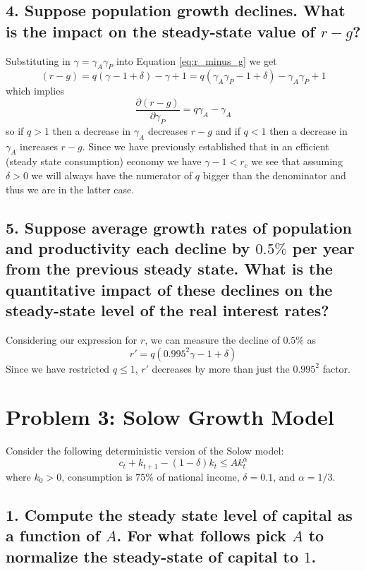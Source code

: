 \documentclass[10pt,letter]{article}
\begin{document}
\subsection*{4. Suppose population growth declines. What is the impact on the steady-state value of $r-g$? }
Substituting in $\gamma = \gamma_A \gamma_P$ into Equation \ref{eq:r_minus_g} we get
\begin{equation*}
	(r-g) = q(\gamma -1 + \delta) - \gamma +1 = q(\gamma_A \gamma_P -1 + \delta) - \gamma_A \gamma_P+1  
\end{equation*}
which implies
\begin{equation*}
	\frac{\partial (r-g)}{\partial \gamma_P} = q\gamma_A - \gamma_A
\end{equation*}
so if $q>1$ then a decrease in $\gamma_A$ decreases $r-g$ and if $q<1$ then a decrease in $\gamma_A$ increases $r-g$. Since we have previously established that in an efficient (steady state consumption) economy we have $\gamma - 1 < r_c$ we see that assuming $\delta >0$ we will always have the numerator of $q$ bigger than the denominator and thus we are in the latter case.
\subsection*{5. Suppose average growth rates of population and productivity each decline by $0.5\%$ per year from the previous steady state. What is the quantitative impact of these declines on the steady-state level of the real interest rates? }

Considering our expression for $r$, we can measure the decline of $0.5\%$ as 
\begin{equation*}
	  r' = q(0.995^2 \gamma -1 + \delta)
\end{equation*}
Since we have restricted $q\leq1$, $r'$ decreases by more than just the $0.995^2$ factor. 
\section*{Problem 3: Solow Growth Model}
Consider the following deterministic version of the Solow model:
\begin{equation*}
	c_t + k_{t+1} - (1-\delta)k_t \leq Ak_t^{\alpha}
\end{equation*}
where $k_0 > 0$, consumption is $75\%$ of national income, $\delta = 0.1$, and $\alpha = 1/3$. 

	\subsection*{1. Compute the steady state level of capital as a function of $A$. For what follows pick $A$ to normalize the steady-state of capital to $1$. }
	
\end{document}
